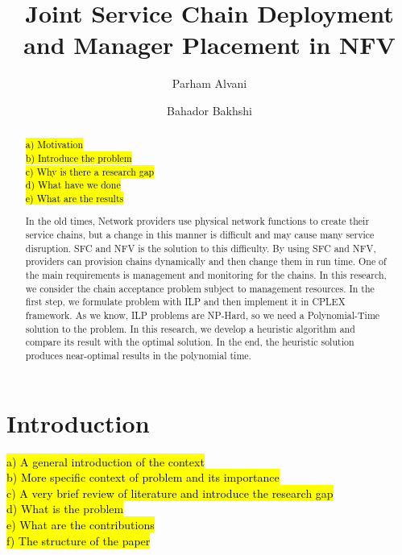 \documentclass[preprint,review,12pt]{elsarticle}
\newcommand{\hly}[2][yellow]{
  {\sethlcolor{#1} \hl{#2}}
}
\begin{document}
\begin{frontmatter}

\title{Joint Service Chain Deployment and Manager Placement in NFV}

\author[aut]{Parham Alvani}

\author[aut]{Bahador Bakhshi
}


\address[aut]{Amirkabir University of Technology, Tehran, Iran}

\begin{abstract}
\hly{%
a) Motivation \\
b) Introduce the problem \\
c) Why is there a research gap \\
d) What have we done \\
e) What are the results \\
}

In the old times, Network providers use physical network functions to create their service chains, but a change in this manner is difficult and may cause many service disruption.
SFC and NFV is the solution to this difficulty. By using SFC and NFV, providers can provision chains dynamically and then change them in run time.
One of the main requirements is management and monitoring for the chains.
In this research, we consider the chain acceptance problem subject to management resources. In the first step, we formulate
problem with ILP and then implement it in CPLEX framework. As we know, ILP problems are NP-Hard, so we need a Polynomial-Time solution to the problem.
In this research, we develop a heuristic algorithm and compare its result with the optimal solution. In the end, the heuristic solution produces near-optimal results in the polynomial time.
\end{abstract}

\begin{keyword}
\end{keyword}

\end{frontmatter}

\section{Introduction}
\hly{%
a) A general introduction of the context \\
b) More specific context of problem and its importance \\
c) A very brief review of literature and introduce the research gap \\
d) What is the problem \\
e) What are the contributions \\
f) The structure of the paper \\
}

\end{document}
